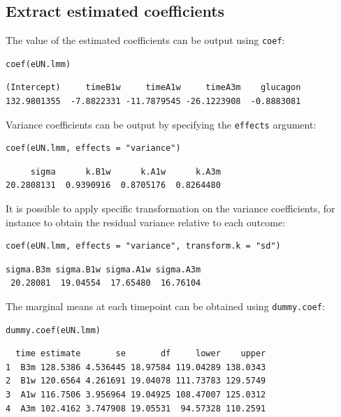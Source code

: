 \documentclass[12pt]{article}
\begin{document}
\subsection{Extract estimated coefficients}
\label{sec:org113cf40}
The value of the estimated coefficients can be output using \texttt{coef}:
\lstset{language=r,label= ,caption= ,captionpos=b,numbers=none}
\begin{lstlisting}
coef(eUN.lmm)
\end{lstlisting}

\begin{verbatim}
(Intercept)     timeB1w     timeA1w     timeA3m    glucagon 
132.9801355  -7.8822331 -11.7879545 -26.1223908  -0.8883081
\end{verbatim}


Variance coefficients can be output by specifying the \texttt{effects} argument:
\lstset{language=r,label= ,caption= ,captionpos=b,numbers=none}
\begin{lstlisting}
coef(eUN.lmm, effects = "variance")
\end{lstlisting}

\begin{verbatim}
     sigma      k.B1w      k.A1w      k.A3m 
20.2808131  0.9390916  0.8705176  0.8264480
\end{verbatim}



It is possible to apply specific transformation on the variance
coefficients, for instance to obtain the residual variance relative to
each outcome:
\lstset{language=r,label= ,caption= ,captionpos=b,numbers=none}
\begin{lstlisting}
coef(eUN.lmm, effects = "variance", transform.k = "sd")
\end{lstlisting}

\begin{verbatim}
sigma.B3m sigma.B1w sigma.A1w sigma.A3m 
 20.28081  19.04554  17.65480  16.76104
\end{verbatim}


The marginal means at each timepoint can be obtained using \texttt{dummy.coef}:
\lstset{language=r,label= ,caption= ,captionpos=b,numbers=none}
\begin{lstlisting}
dummy.coef(eUN.lmm)
\end{lstlisting}

\begin{verbatim}
  time estimate       se       df     lower    upper
1  B3m 128.5386 4.536445 18.97584 119.04289 138.0343
2  B1w 120.6564 4.261691 19.04078 111.73783 129.5749
3  A1w 116.7506 3.956964 19.04925 108.47007 125.0312
4  A3m 102.4162 3.747908 19.05531  94.57328 110.2591
\end{verbatim}
\end{document}
